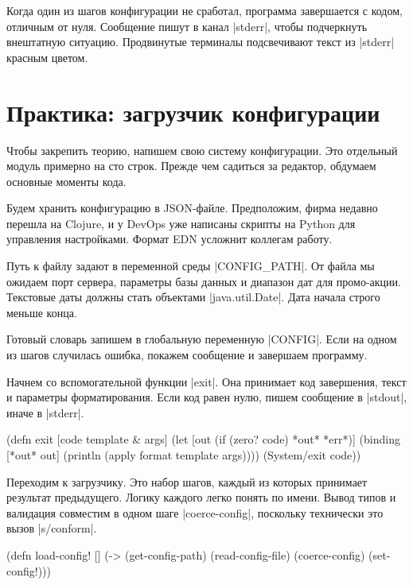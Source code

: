 Когда один из шагов конфигурации не сработал, программа завершается с кодом,
отличным от нуля. Сообщение пишут в канал \spverb|stderr|, чтобы подчеркнуть
внештатную ситуацию. Продвинутые терминалы подсвечивают текст из \spverb|stderr|
красным цветом.

\section{Практика: загрузчик конфигурации}

Чтобы закрепить теорию, напишем свою систему конфигурации. Это отдельный модуль
примерно на сто строк. Прежде чем садиться за редактор, обдумаем основные
моменты кода.

Будем хранить конфигурацию в JSON-файле. Предположим, фирма недавно перешла на
Clojure, и у DevOps уже написаны скрипты на Python для управления
настройками. Формат EDN усложнит коллегам работу.

Путь к файлу задают в переменной среды \spverb|CONFIG_PATH|. От файла мы ожидаем
порт сервера, параметры базы данных и диапазон дат для промо-акции. Текстовые
даты должны стать объектами \spverb|java.util.Date|. Дата начала строго меньше
конца.

Готовый словарь запишем в глобальную переменную \spverb|CONFIG|. Если на одном
из шагов случилась ошибка, покажем сообщение и завершаем программу.

Начнем со вспомогательной функции \spverb|exit|. Она принимает код завершения,
текст и параметры форматирования. Если код равен нулю, пишем сообщение в
\spverb|stdout|, иначе в \spverb|stderr|.

\begin{english}
  \begin{clojure}
(defn exit
  [code template & args]
  (let [out (if (zero? code) *out* *err*)]
    (binding [*out* out]
      (println (apply format template args))))
  (System/exit code))
  \end{clojure}
\end{english}

Переходим к загрузчику. Это набор шагов, каждый из которых принимает результат
предыдущего. Логику каждого легко понять по имени. Вывод типов и валидация
совместим в одном шаге \spverb|coerce-config|, поскольку технически это вызов
\spverb|s/conform|.

\begin{english}
  \begin{clojure}
(defn load-config! []
  (-> (get-config-path)
      (read-config-file)
      (coerce-config)
      (set-config!)))
  \end{clojure}
\end{english}

